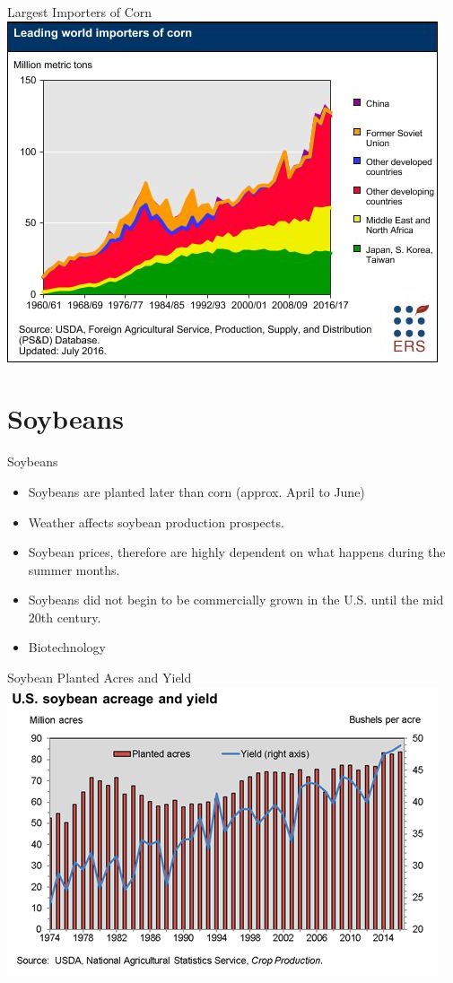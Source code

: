 \documentclass{beamer}
\begin{document}
\begin{frame}{Largest Importers of Corn}
\includegraphics[width=.75\textwidth]{Corn-World-Importers.png}
\end{frame}

\section{Soybeans}

\begin{frame}[<+-| alert@+>]{Soybeans}
\begin{itemize}
\item Soybeans are planted later than corn (approx. April to June)
\item Weather affects soybean production prospects.
\item Soybean prices, therefore are highly dependent on what happens during the summer months.
\item Soybeans did not begin to be commercially grown in the U.S. until the mid 20th century.
\item Biotechnology
\end{itemize}
\end{frame}

\begin{frame}{Soybean Planted Acres and Yield}
\includegraphics[width=.8\textwidth]{Soy-Acres-Yield.png}
\end{frame}
\end{document}
